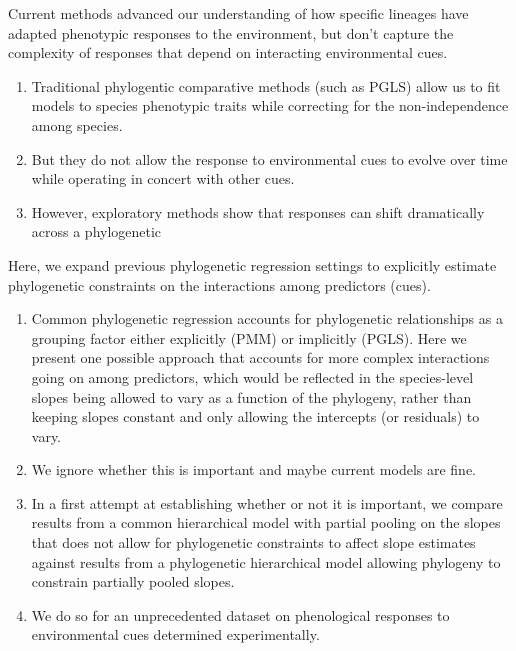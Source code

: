 \documentclass{article}\usepackage[]{graphicx}\usepackage[]{color}
\begin{document}
\item Current methods advanced our understanding of how specific lineages have adapted phenotypic responses to the environment, but don't capture the complexity of responses that depend on interacting environmental cues. 
\begin{enumerate}
\item Traditional phylogentic comparative methods (such as PGLS) allow us to fit models to species phenotypic traits while correcting for the non-independence among species.  %
\item But they do not allow the response to environmental cues to evolve over time while operating in concert with other cues. %
\item However, exploratory methods show that responses can shift dramatically across a phylogenetic  \citep{davies2019phylogenetically}
\end{enumerate} 
\item Here, we expand previous phylogenetic regression settings to explicitly estimate phylogenetic constraints on the interactions among predictors (cues). 
\begin{enumerate}
\item Common phylogenetic regression accounts for phylogenetic relationships as a grouping factor either explicitly (PMM) or implicitly (PGLS). Here we present one possible approach that accounts for more complex interactions going on among predictors, which would be reflected in the species-level slopes being allowed to vary as a function of the phylogeny, rather than keeping slopes constant and only allowing the intercepts (or residuals) to vary. 
\item We ignore whether this is important and maybe current models are fine. 
\item In a first attempt at establishing whether or not it is important, we compare results from a common hierarchical model with partial pooling on the slopes that does not allow for phylogenetic constraints to affect slope estimates against results from a phylogenetic hierarchical model allowing phylogeny to constrain partially pooled slopes. %
\item We do so for an unprecedented dataset on phenological responses to environmental cues determined experimentally. 
\end{enumerate}
\end{document}
